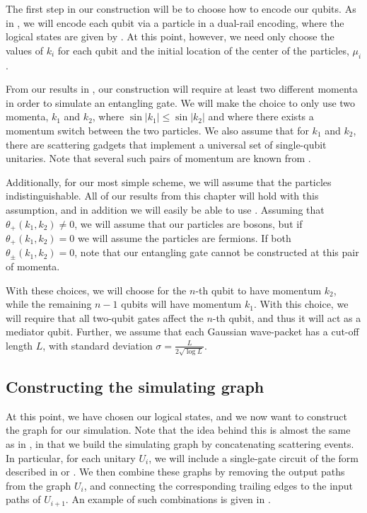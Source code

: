 \documentclass[../thesis-main/thesis-main]{subfiles}
\begin{document}
The first step in our construction will be to choose how to encode our qubits.  As in , we will encode each qubit via a particle in a dual-rail encoding, where the logical states are given by .  At this point, however, we need only choose the values of $k_i$ for each qubit and the initial location of the center of the particles, $\mu_i$.

From our results in , our construction will require at least two different momenta in order to simulate an entangling gate.  We will make the choice to only use two momenta, $k_1$ and $k_2$, where $\sin |k_1| \leq \sin |k_2|$ and where there exists a momentum switch between the two particles.  We also assume that for $k_1$ and $k_2$, there are scattering gadgets that implement a universal set of single-qubit unitaries.  Note that several such pairs of momentum are known from . 

Additionally, for our most simple scheme, we will assume that the particles indistinguishable.  All of our results from this chapter will hold with this assumption, and in addition we will easily be able to use .  Assuming that $\theta_{+}(k_1,k_2) \neq 0$, we will assume that our particles are bosons, but if $\theta_{+}(k_1,k_2) =0$ we will assume the particles are fermions.  If both $\theta_{\pm}(k_1,k_2) = 0$, note that our entangling gate cannot be constructed at this pair of momenta.

With these choices, we will choose for the $n$-th qubit to have momentum $k_2$, while the remaining $n-1$ qubits will have momentum $k_1$.  With this choice, we will require that all two-qubit gates affect the $n$-th qubit, and thus it will act as a mediator qubit.  Further, we assume that each Gaussian wave-packet has a cut-off length $L$, with standard deviation $\sigma = \frac{L}{2\sqrt{\log L}}$.

\subsection{Constructing the simulating graph}

At this point, we have chosen our logical states, and we now want to construct the graph for our simulation.  Note that the idea behind this is almost the same as in , in that we build the simulating graph by concatenating scattering events.  In particular, for each unitary $U_i$, we will include a single-gate circuit of the form described in  or .  We then combine these graphs by removing the output paths from the graph  $U_{i}$, and connecting the corresponding trailing edges to the input paths of $U_{i+1}$.  An example of such combinations is given in .
\end{document}
